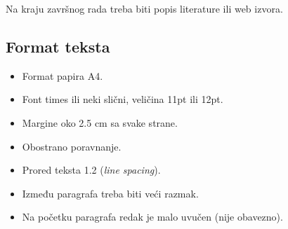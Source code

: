Na kraju završnog rada treba biti popis literature ili web izvora.
\subsection{Format teksta}

\begin{itemize}
 \item Format papira A4.
 \item Font times ili neki slični, veličina 11pt ili 12pt.
 \item Margine oko 2.5 cm sa svake strane. 
 \item Obostrano poravnanje.
 \item Prored teksta 1.2 (\textit{line spacing}).
 \item Između paragrafa treba biti veći razmak.
 \item Na početku paragrafa redak je malo uvučen (nije obavezno).
 \end{itemize}

